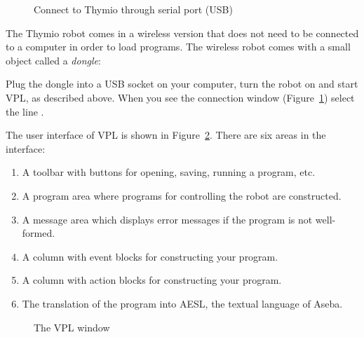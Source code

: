 \begin{figure}
\begin{center}
\caption{Connect to Thymio through serial port (USB)}\label{fig.connect}
\end{center}
\end{figure}


The Thymio robot comes in a wireless version that does not need to be connected
to a computer in order to load programs. The wireless robot comes with a small object called a \emph{dongle}:


Plug the dongle into a USB socket on your computer, turn the robot on and start VPL, as described above. When you see the connection window (Figure~\ref{fig.connect}) select the line .




The user interface of VPL is shown in Figure~\ref{fig.vplgui}.
There are six areas in the interface:
\begin{enumerate}
\item A toolbar with buttons for opening, saving, running a program, etc.
\item A program area where programs for controlling the robot are constructed.
\item A message area which displays error messages if the program is not
well-formed.
\item A column with event blocks for constructing your program.
\item A column with action blocks for constructing your program.
\item The translation of the program into AESL, the textual language of Aseba.
\end{enumerate}

\plainfloat
\begin{figure}[h]
\caption{The VPL window}\label{fig.vplgui}
\end{figure}
\framedfloat


